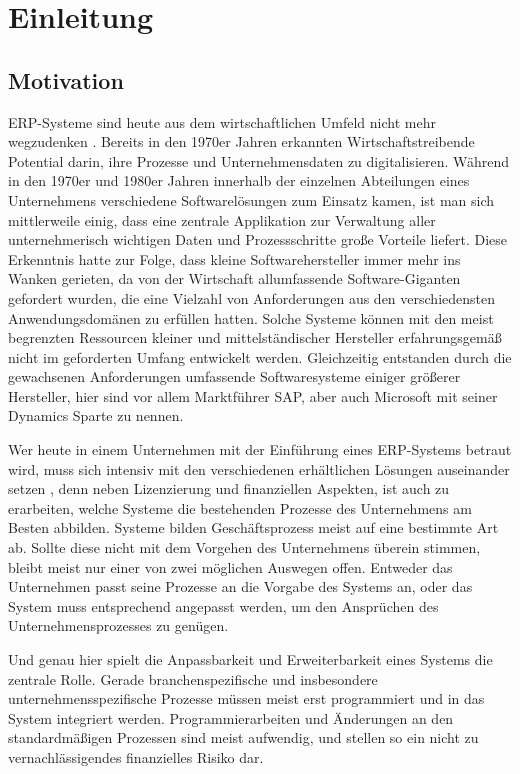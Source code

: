 \chapter{Einleitung}
\label{cha:Einleitung}

\section{Motivation}
\label{sec:Motivation}

ERP-Systeme sind heute aus dem wirtschaftlichen Umfeld nicht mehr wegzudenken \cite{WongTein2003}\cite{DuplagaMarzie2003}. Bereits in den 1970er Jahren erkannten Wirtschaftstreibende Potential darin, ihre Prozesse und Unternehmensdaten zu digitalisieren. Während in den 1970er und 1980er Jahren innerhalb der einzelnen Abteilungen eines Unternehmens verschiedene Softwarelösungen zum Einsatz kamen, ist man sich mittlerweile einig, dass eine zentrale Applikation zur Verwaltung aller unternehmerisch wichtigen Daten und Prozessschritte große Vorteile liefert. Diese Erkenntnis hatte zur Folge, dass kleine Softwarehersteller immer mehr ins Wanken gerieten, da von der Wirtschaft allumfassende Software-Giganten gefordert wurden, die eine Vielzahl von Anforderungen aus den verschiedensten Anwendungsdomänen zu erfüllen hatten. Solche Systeme können mit den meist begrenzten Ressourcen kleiner und mittelständischer Hersteller erfahrungsgemäß nicht im geforderten Umfang entwickelt werden. Gleichzeitig entstanden durch die gewachsenen Anforderungen umfassende Softwaresysteme einiger größerer Hersteller, hier sind vor allem Marktführer SAP, aber auch Microsoft mit seiner Dynamics Sparte zu nennen.

Wer heute in einem Unternehmen mit der Einführung eines ERP-Systems betraut wird, muss sich intensiv mit den verschiedenen erhältlichen Lösungen auseinander setzen \cite{WongTein2003}, denn neben Lizenzierung und finanziellen Aspekten, ist auch zu erarbeiten, welche Systeme die bestehenden Prozesse des Unternehmens am Besten abbilden. Systeme bilden Geschäftsprozess meist auf eine bestimmte Art ab. Sollte diese nicht mit dem Vorgehen des Unternehmens überein stimmen, bleibt meist nur einer von zwei möglichen Auswegen offen. Entweder das Unternehmen passt seine Prozesse an die Vorgabe des Systems an, oder das System muss entsprechend angepasst werden, um den Ansprüchen des Unternehmensprozesses zu genügen.

Und genau hier spielt die Anpassbarkeit und Erweiterbarkeit eines Systems die zentrale Rolle. Gerade branchenspezifische und insbesondere unternehmensspezifische Prozesse müssen meist erst programmiert und in das System integriert werden. Programmierarbeiten und Änderungen an den standardmäßigen Prozessen sind meist aufwendig, und stellen so ein nicht zu vernachlässigendes finanzielles Risiko dar.

